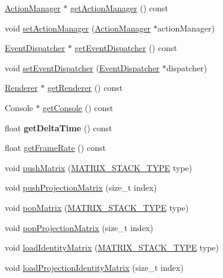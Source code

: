 \begin{DoxyCompactItemize}
\item 
\hyperlink{classActionManager}{Action\+Manager} $\ast$ \hyperlink{classDirector_aecb253e4de577ebd009367f27d2a07de}{get\+Action\+Manager} () const
\item 
void \hyperlink{classDirector_acf717de7917cf4ffd0a3e1c2b1965628}{set\+Action\+Manager} (\hyperlink{classActionManager}{Action\+Manager} $\ast$action\+Manager)
\item 
\hyperlink{classEventDispatcher}{Event\+Dispatcher} $\ast$ \hyperlink{classDirector_ae5984b5ba756d210fa4ec79578d17ca8}{get\+Event\+Dispatcher} () const
\item 
void \hyperlink{classDirector_aaba36d4ea12402524b17755dc3b26b91}{set\+Event\+Dispatcher} (\hyperlink{classEventDispatcher}{Event\+Dispatcher} $\ast$dispatcher)
\item 
\hyperlink{classRenderer}{Renderer} $\ast$ \hyperlink{classDirector_a45e283c703cf856467ccbe484da739c5}{get\+Renderer} () const
\item 
Console $\ast$ \hyperlink{classDirector_a84f3750550158cbd24de5d7783852a12}{get\+Console} () const
\item 
\mbox{\label{classDirector_a81022b89d60dbe3912084200953dbbbe}} 
float {\bfseries get\+Delta\+Time} () const
\item 
float \hyperlink{classDirector_adb86cf6aa40949fd1d43ef8f837062e8}{get\+Frame\+Rate} () const
\item 
void \hyperlink{classDirector_afbc7bc9b5641105eae937965146ea3e2}{push\+Matrix} (\hyperlink{group__base_ga4d146cef7130a8f3a953d46964ea3905}{M\+A\+T\+R\+I\+X\+\_\+\+S\+T\+A\+C\+K\+\_\+\+T\+Y\+PE} type)
\item 
void \hyperlink{classDirector_ad8bff3b0904a396202573b21b0bef62b}{push\+Projection\+Matrix} (size\+\_\+t index)
\item 
void \hyperlink{classDirector_a4c47574ac63626fa0e14eee27fed8b99}{pop\+Matrix} (\hyperlink{group__base_ga4d146cef7130a8f3a953d46964ea3905}{M\+A\+T\+R\+I\+X\+\_\+\+S\+T\+A\+C\+K\+\_\+\+T\+Y\+PE} type)
\item 
void \hyperlink{classDirector_a116deb880d80374176070cac631a6fa2}{pop\+Projection\+Matrix} (size\+\_\+t index)
\item 
void \hyperlink{classDirector_a3491e578d2d80809b44892144bd6645a}{load\+Identity\+Matrix} (\hyperlink{group__base_ga4d146cef7130a8f3a953d46964ea3905}{M\+A\+T\+R\+I\+X\+\_\+\+S\+T\+A\+C\+K\+\_\+\+T\+Y\+PE} type)
\item 
void \hyperlink{classDirector_a03fb01ab412fed87f3fc86ce08f775be}{load\+Projection\+Identity\+Matrix} (size\+\_\+t index)

\end{DoxyCompactItemize}
